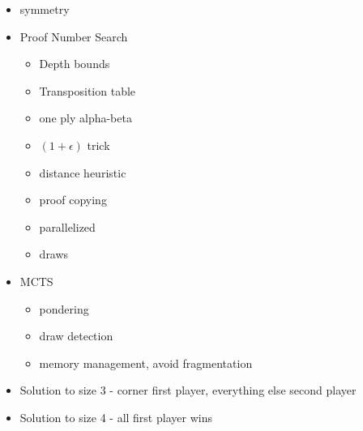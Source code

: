 
\begin{itemize}
\item symmetry
\item Proof Number Search
	\begin{itemize}
		\item Depth bounds
		\item Transposition table
		\item one ply alpha-beta
		\item $(1+\epsilon)$ trick
		\item distance heuristic
		\item proof copying
		\item parallelized
		\item draws
	\end{itemize}

\item MCTS
	\begin{itemize}
		\item pondering
		\item draw detection
		\item memory management, avoid fragmentation
	\end{itemize}

\item Solution to size 3 - corner first player, everything else second player
\item Solution to size 4 - all first player wins


\end{itemize}
